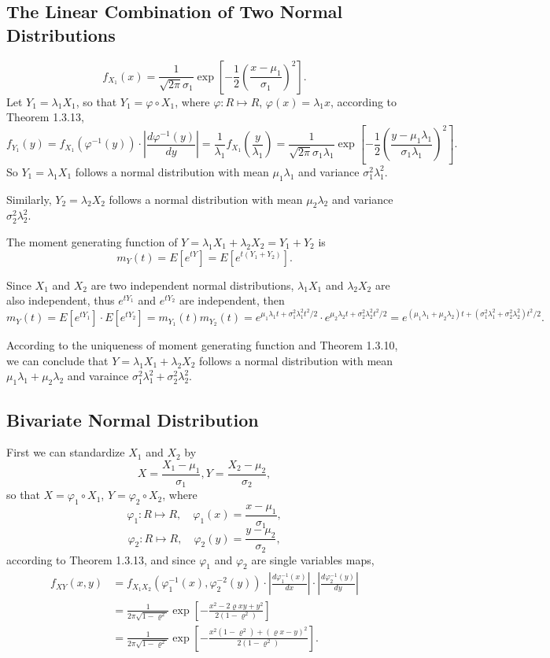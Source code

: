 \documentclass[11pt,a4paper]{article}
\begin{document}
\subsection{The Linear Combination of Two Normal Distributions}

$$f_{X_1}(x)=\frac{1}{\sqrt{2\pi}\sigma_1}\exp\left[-\frac{1}{2}\left(\frac{x-\mu_1}{\sigma_1}\right)^2\right].$$
Let $Y_1=\lambda_1X_1$, so that $Y_1=\varphi\circ X_1$, where $\varphi:R\mapsto R$, $\varphi(x)=\lambda_1 x$, according to Theorem 1.3.13,
$$f_{Y_1}(y)=f_{X_1}(\varphi^{-1}(y))\cdot\left|\frac{d\varphi^{-1}(y)}{dy}\right|=\frac{1}{\lambda_1}f_{X_1}\left(\frac{y}{\lambda_1}\right)=\frac{1}{\sqrt{2\pi}\sigma_1\lambda_1}\exp\left[-\frac{1}{2}\left(\frac{y-\mu_1\lambda_1}{\sigma_1\lambda_1}\right)^2\right].$$
So $Y_1=\lambda_1X_1$ follows a normal distribution with mean $\mu_1\lambda_1$ and variance $\sigma_1^2\lambda_1^2$.

Similarly, $Y_2=\lambda_2X_2$ follows a normal distribution with mean $\mu_2\lambda_2$ and variance $\sigma_2^2\lambda_2^2$.

The moment generating function of $Y=\lambda_1X_1+\lambda_2X_2=Y_1+Y_2$ is
$$m_Y(t)=E[e^{tY}]=E[e^{t(Y_1+Y_2)}].$$

Since $X_1$ and $X_2$ are two independent normal distributions, $\lambda_1X_1$ and $\lambda_2X_2$ are also independent, thus $e^{tY_1}$ and $e^{tY_2}$ are independent, then
$$m_Y(t)=E[e^{tY_1}]\cdot E[e^{tY_2}]=m_{Y_1}(t)m_{Y_2}(t)=e^{\mu_1\lambda_1t+\sigma_1^2\lambda_1^2t^2/2}\cdot e^{\mu_2\lambda_2t+\sigma_2^2\lambda_2^2t^2/2}=e^{(\mu_1\lambda_1+\mu_2\lambda_2)t+(\sigma_1^2\lambda_1^2+\sigma_2^2\lambda_2^2)t^2/2}.$$

According to the uniqueness of moment generating function and Theorem 1.3.10, we can conclude that $Y=\lambda_1X_1+\lambda_2X_2$ follows a normal distribution with mean $\mu_1\lambda_1+\mu_2\lambda_2$ and varaince $\sigma_1^2\lambda_1^2+\sigma_2^2\lambda_2^2$.

\subsection{Bivariate Normal Distribution}
First we can standardize $X_1$ and $X_2$ by
$$X=\frac{X_1-\mu_1}{\sigma_1},Y=\frac{X_2-\mu_2}{\sigma_2},$$
so that $X=\varphi_1\circ X_1$, $Y=\varphi_2\circ X_2$, where 
$$\varphi_1:R\mapsto R,\quad \varphi_1(x)=\frac{x-\mu_1}{\sigma_1},$$
$$\varphi_2:R\mapsto R,\quad \varphi_2(y)=\frac{y-\mu_2}{\sigma_2},$$
according to Theorem 1.3.13, and since $\varphi_1$ and $\varphi_2$ are single variables maps,
\begin{align*}
f_{XY}(x,y)&=f_{X_1X_2}(\varphi_1^{-1}(x),\varphi_2^{-2}(y))\cdot\left|\frac{d\varphi_1^{-1}(x)}{dx}\right|\cdot\left|\frac{d\varphi_2^{-1}(y)}{dy}\right|\\
&=\frac{1}{2\pi\sqrt{1-\varrho^2}}\exp\left[-\frac{x^2-2\varrho xy+y^2}{2(1-\varrho^2)}\right]\\
&=\frac{1}{2\pi\sqrt{1-\varrho^2}}\exp\left[-\frac{x^2(1-\varrho^2)+(\varrho x-y)^2}{2(1-\varrho^2)}\right].
\end{align*}
\end{document}
